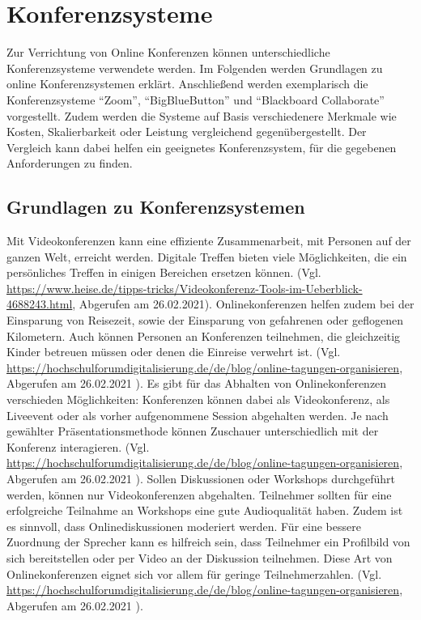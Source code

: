 \chapter{Konferenzsysteme}
Zur Verrichtung von Online Konferenzen können unterschiedliche Konferenzsysteme verwendete werden. Im Folgenden werden Grundlagen zu online Konferenzsystemen erklärt. Anschließend werden exemplarisch die Konferenzsysteme \enquote{Zoom}, \enquote{BigBlueButton} und \enquote{Blackboard Collaborate} vorgestellt. Zudem werden die Systeme auf Basis verschiedenere Merkmale wie Kosten, Skalierbarkeit oder Leistung vergleichend gegenübergestellt. Der Vergleich kann dabei helfen ein geeignetes Konferenzsystem, für die gegebenen Anforderungen zu finden.

\section{Grundlagen zu Konferenzsystemen}
Mit Videokonferenzen kann eine effiziente Zusammenarbeit, mit Personen auf der ganzen Welt, erreicht werden. Digitale Treffen bieten viele Möglichkeiten, die ein persönliches Treffen in einigen Bereichen ersetzen können. (Vgl. \url{https://www.heise.de/tipps-tricks/Videokonferenz-Tools-im-Ueberblick-4688243.html}, Abgerufen am 26.02.2021).
Onlinekonferenzen helfen zudem bei der Einsparung von Reisezeit, sowie der Einsparung von gefahrenen oder geflogenen Kilometern. Auch können Personen an Konferenzen teilnehmen, die gleichzeitig Kinder betreuen müssen oder denen die Einreise verwehrt ist. (Vgl. \url{https://hochschulforumdigitalisierung.de/de/blog/online-tagungen-organisieren}, Abgerufen am 26.02.2021 ).
Es gibt für das Abhalten von Onlinekonferenzen verschieden Möglichkeiten:
Konferenzen können dabei als Videokonferenz, als Liveevent oder als vorher aufgenommene Session abgehalten werden. Je nach gewählter Präsentationsmethode können Zuschauer unterschiedlich mit der Konferenz interagieren. (Vgl. \url{https://hochschulforumdigitalisierung.de/de/blog/online-tagungen-organisieren}, Abgerufen am 26.02.2021 ).
Sollen Diskussionen oder Workshops durchgeführt werden, können nur Videokonferenzen abgehalten. Teilnehmer sollten für eine erfolgreiche Teilnahme an Workshops eine gute Audioqualität haben. Zudem ist es sinnvoll, dass Onlinediskussionen moderiert werden. Für eine bessere Zuordnung der Sprecher kann es hilfreich sein, dass Teilnehmer ein Profilbild von sich bereitstellen oder per Video an der Diskussion teilnehmen. Diese Art von Onlinekonferenzen eignet sich vor allem für geringe Teilnehmerzahlen. (Vgl. \url{https://hochschulforumdigitalisierung.de/de/blog/online-tagungen-organisieren}, Abgerufen am 26.02.2021 ).
